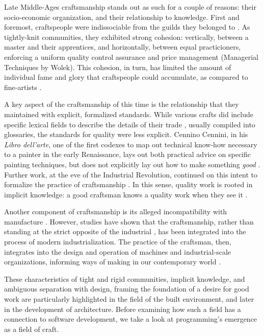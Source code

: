 Late Middle-Ages craftsmanship stands out as such for a couple of reasons: their socio-economic organization, and their relationship to knowledge. First and foremost, craftspeople were indissociable from the guilds they belonged to \citep{black_guilds_1984}. As tightly-knit communities, they exhibited strong cohesion: vertically, between a master and their apprentices, and horizontally, between equal practicioners, enforcing a uniform quality control assurance and price management (Managerial Techniques by Wolek). This cohesion, in turn, has limited the amount of individual fame and glory that craftspeople could accumulate, as compared to fine-artists \citep{thompson_materials_1956}.

A key aspect of the craftsmanship of this time is the relationship that they maintained with explicit, formalized standards. While various crafts did include specific lexical fields to describe the details of their trade \citep{bassett_craftsman_2008}, usually compiled into glossaries, the standards for quality were less explicit. Cennino Cennini, in his \emph{Libro dell'arte}, one of the first codexes to map out technical know-how necessary to a painter in the early Renaissance, lays out both practical advice on specific painting techniques, but does not explicitly lay out how to make something \emph{good} \citep{cennini_craftsman_2012}. Further work, at the eve of the Industrial Revolution, continued on this intent to formalize the practice of craftsmanship \citep{pannabecker_diderot_1994}. In this sense, quality work is rooted in implicit knowledge: a good craftsman knows a quality work when they see it \citep{sennett_craftsman_2009}.

Another component of craftsmanship is its alleged incompatibility with manufacture \citep{ruskin_seven_1920,sturt_wheelwright_1963}. However, studies have shown that the craftsmanship, rather than standing at the strict opposite of the industrial \citep{jones_reckoning_2016}, has been integrated into the process of modern industrialization. The practice of the craftsman, then, integrates into the design and operation of machines and industrial-scale organizations, informing ways of making in our contemporary world \citep{gordon_who_1988,mcgee_craftsmanship_1999}.

These characteristics of tight and rigid communities, implicit knowledge, and ambiguous separation with design, framing the foundation of a desire for good work are particularly highlighted in the field of the built environment, and later in the development of architecture. Before examining how such a field has a connection to software development, we take a look at programming's emergence as a field of craft.

